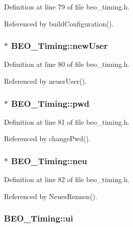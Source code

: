 Definition at line 79 of file beo\_\-timing.h.

Referenced by buildConfiguration().\hypertarget{class_b_e_o___timing_dbc64dafa7003517063029cd10e2b583}{
\subsubsection[newUser]{$\ast$ {\bf BEO\_\-Timing::newUser}}}
\label{class_b_e_o___timing_dbc64dafa7003517063029cd10e2b583}




Definition at line 80 of file beo\_\-timing.h.

Referenced by neuerUser().\hypertarget{class_b_e_o___timing_00ca0d5e67f1d99118b529b9a9cbed9f}{
\subsubsection[pwd]{$\ast$ {\bf BEO\_\-Timing::pwd}}}
\label{class_b_e_o___timing_00ca0d5e67f1d99118b529b9a9cbed9f}




Definition at line 81 of file beo\_\-timing.h.

Referenced by changePwd().\hypertarget{class_b_e_o___timing_4a79dc06af7ae3a6f89459062e2a7b85}{
\subsubsection[neu]{$\ast$ {\bf BEO\_\-Timing::neu}}}
\label{class_b_e_o___timing_4a79dc06af7ae3a6f89459062e2a7b85}




Definition at line 82 of file beo\_\-timing.h.

Referenced by NeuesRennen().\hypertarget{class_b_e_o___timing_4e75592803bdf66af32320a30b8972c2}{
\subsubsection[ui]{ {\bf BEO\_\-Timing::ui}}}
\label{class_b_e_o___timing_4e75592803bdf66af32320a30b8972c2}




